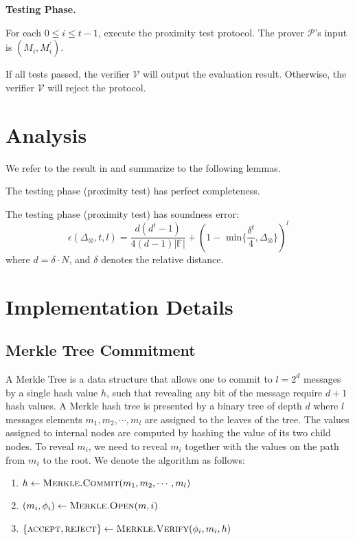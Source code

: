 \textbf{Testing Phase.}

For each $0 \le i \le t-1$, execute the proximity test protocol. The prover $\mathcal{P}$'s input is $(M_i, M_i^{\prime})$.

If all tests passed, the verifier $\mathcal{V}$ will output the evaluation result. Otherwise, the verifier $\mathcal{V}$ will reject the protocol.

\section{Analysis}

We refer to the result in \cite{cryptoeprint:2020/1426} and summarize to the following lemmas. 

\begin{lemma}
\label{lemma:pc-completeness}
The testing phase (proximity test) has perfect completeness.
\end{lemma}

\begin{lemma}
\label{lemma:pc-soundness}
The testing phase (proximity test) has soundness error:
$$
    \epsilon(\Delta_\otimes, t, l) = \frac{d(d^t-1)}{4(d-1)|\mathbb{F}|} + (1 - \text{ min}\{\frac{\delta^t}{4}, \Delta_\otimes \})^l
$$
where $d = \delta \cdot N$, and $\delta$ denotes the relative distance.
\end{lemma}



\section{Implementation Details}

\subsection{Merkle Tree Commitment}

A Merkle Tree is a data structure that allows one to commit to $l = 2^{d}$ messages by a single hash value $h$, such that revealing any bit of the message require $d+1$ hash values. A Merkle hash tree is presented by a binary tree of depth $d$ where $l$ messages elements $m_1, m_2, \cdots, m_l$ are assigned to the leaves of the tree. The values assigned to internal nodes are computed by hashing the value of its two child nodes. To reveal $m_i$, we need to reveal $m_i$ together with the values on the path from $m_i$ to the root. We denote the algorithm as follows:

\begin{enumerate}
    \item $h \leftarrow \textsc{Merkle.Commit}(m_1, m_2, \cdots, m_l)$
    \item $(m_i, \phi_i) \leftarrow \textsc{Merkle.Open}(m, i)$
    \item $\{\textsc{accept}, \textsc{reject}\} \leftarrow \textsc{Merkle.Verify}(\phi_i, m_i, h)$
\end{enumerate}

